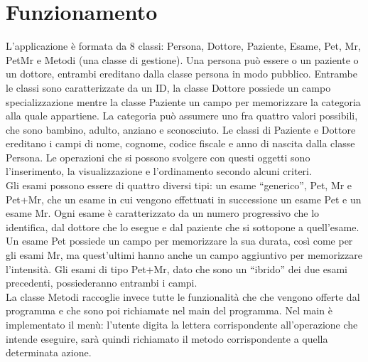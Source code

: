 \documentclass[a4paper,12pt]{article}
\begin{document}
{\section*{Funzionamento} 
L’applicazione è formata da 8 classi: Persona, Dottore, Paziente, Esame, Pet, Mr, PetMr e Metodi (una classe di gestione). Una persona può essere o un paziente o un dottore, entrambi ereditano dalla classe persona in modo pubblico. Entrambe le classi sono caratterizzate da un ID, la classe Dottore possiede un campo specializzazione mentre la classe Paziente un campo per memorizzare la categoria alla quale appartiene. La categoria può assumere uno fra quattro valori possibili, che sono bambino, adulto, anziano e sconosciuto. Le classi di Paziente e Dottore ereditano i campi di nome, cognome, codice fiscale e anno di nascita dalla classe Persona. Le operazioni che si possono svolgere con questi oggetti sono l'inserimento, la visualizzazione e l'ordinamento secondo alcuni criteri. \\
Gli esami possono essere di quattro diversi tipi: un esame ``generico'', Pet, Mr e Pet+Mr, che un esame in cui vengono effettuati in successione un esame Pet e un esame Mr. Ogni esame è caratterizzato da un numero progressivo che lo identifica, dal dottore che lo esegue e dal paziente che si sottopone a quell'esame. Un esame Pet possiede un campo per memorizzare la sua durata, così come per gli esami Mr, ma quest'ultimi hanno anche un campo aggiuntivo per memorizzare l'intensità. Gli esami di tipo Pet+Mr, dato che sono un ``ibrido'' dei due esami precedenti, possiederanno entrambi i campi.  \\
La classe Metodi raccoglie invece tutte le funzionalità che che vengono offerte dal programma e che sono poi richiamate nel main del programma. Nel main è implementato il menù: l'utente digita la lettera corrispondente all’operazione che intende eseguire, sarà quindi richiamato il metodo corrispondente a quella determinata azione. 

\clearpage
\newpage
}
\end{document}
